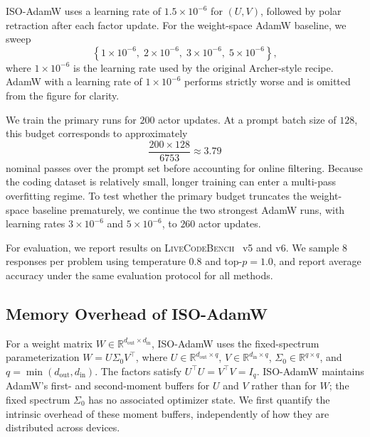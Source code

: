 \documentclass[11pt, a4paper]{utda}
\theoremstyle{plain}
\theoremstyle{definition}
\theoremstyle{remark}
\begin{document}
ISO-AdamW uses a learning rate of
$1.5\times10^{-6}$ for $(U,V)$, followed by polar retraction after each factor
update. For the weight-space AdamW baseline, we sweep
\[
    \left\{
        1\times10^{-6},
        \;2\times10^{-6},
        \;3\times10^{-6},
        \;5\times10^{-6}
    \right\},
\]
where $1\times10^{-6}$ is the learning rate used by the original
Archer-style recipe. AdamW with a learning rate of $1\times10^{-6}$ performs strictly worse and is omitted from the figure for clarity.

We train the primary runs for $200$ actor updates. At a prompt batch size of
$128$, this budget corresponds to approximately
\[
    \frac{200\times128}{6753}
    \approx
    3.79
\]
nominal passes over the prompt set before accounting for online filtering.
Because the coding dataset is relatively small, longer training can enter a
multi-pass overfitting regime. To test whether the primary budget truncates the
weight-space baseline prematurely, we continue the two strongest AdamW runs,
with learning rates $3\times10^{-6}$ and $5\times10^{-6}$, to $260$ actor
updates.

For evaluation, we report results on
\textsc{LiveCodeBench}~\cite{livecodebench} v5 and v6. We sample $8$
responses per problem using temperature $0.8$ and top-$p=1.0$, and report
average accuracy under the same evaluation protocol for all methods.

\subsection{Memory Overhead of ISO-AdamW}
\label{app:memory_overhead}

For a weight matrix $W\in\mathbb{R}^{d_{\mathrm{out}}\times d_{\mathrm{in}}}$,
ISO-AdamW uses the fixed-spectrum parameterization $W=U\Sigma_0V^\top$, where $U\in\mathbb{R}^{d_{\mathrm{out}}\times q}$, $V\in\mathbb{R}^{d_{\mathrm{in}}\times q}$,
$\Sigma_0\in\mathbb{R}^{q\times q}$, and $q=\min(d_{\mathrm{out}},d_{\mathrm{in}})$. The factors satisfy $U^\top U=V^\top V=I_q$. ISO-AdamW maintains AdamW's first- and second-moment buffers for $U$ and $V$ rather than for $W$; the fixed spectrum $\Sigma_0$ has no associated optimizer state. We first quantify the intrinsic overhead of these moment buffers, independently of how they are distributed across devices.
\end{document}
